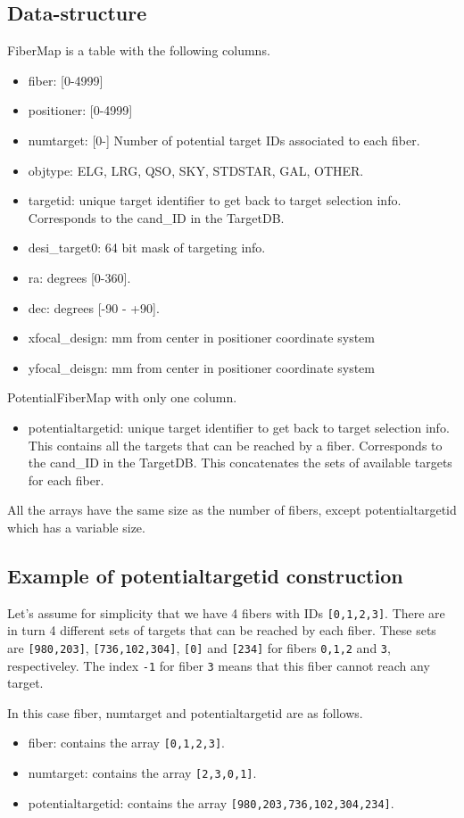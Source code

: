 \documentclass{article}
\begin{document}
\subsection{Data-structure}

FiberMap is a table with the following columns.
\begin{itemize}
\item fiber: [0-4999]
\item positioner: [0-4999]
\item numtarget: [0-] Number of potential target IDs associated to each
  fiber. 
\item objtype: ELG, LRG, QSO, SKY, STDSTAR, GAL, OTHER. 
\item targetid: 
  unique target identifier to get back to target
  selection info. Corresponds to the cand\_ID in the TargetDB.
\item desi\_target0: 64 bit mask of targeting info. 
\item ra: degrees [0-360]. 
\item dec: degrees [-90 - +90]. 
\item xfocal\_design: mm from center in positioner coordinate system 
\item yfocal\_deisgn: mm from center in positioner coordinate system  
\end{itemize}

\noindent
PotentialFiberMap with only one column.
\begin{itemize}
\item potentialtargetid:  unique target identifier to get back to target
  selection info. This contains  all the targets that can be
  reached by a fiber. Corresponds to the cand\_ID in the TargetDB. 
  This concatenates the sets of available
  targets for each fiber.
\end{itemize}
All the arrays have the same size as the number of fibers, except
potentialtargetid which has a variable size.



\subsection{Example of potentialtargetid construction}
Let's assume for simplicity that we have 4 fibers with IDs
\texttt{[0,1,2,3]}. There are in turn 4 different sets of targets that
can be reached by each fiber. These sets are \texttt{[980,203]},
\texttt{[736,102,304]}, \texttt{[0]} and \texttt{[234]} for fibers
\texttt{0,1,2} and \texttt{3}, respectiveley.
The index \texttt{-1} for fiber \texttt{3} means that this fiber
cannot reach any target.

In this case fiber, numtarget and potentialtargetid are as follows.
\begin{itemize}
\item
fiber: contains the array \texttt{[0,1,2,3]}.
\item
numtarget: contains the array \texttt{[2,3,0,1]}.
\item
potentialtargetid: contains the array \texttt{[980,203,736,102,304,234]}.

\end{itemize}
\end{document}
